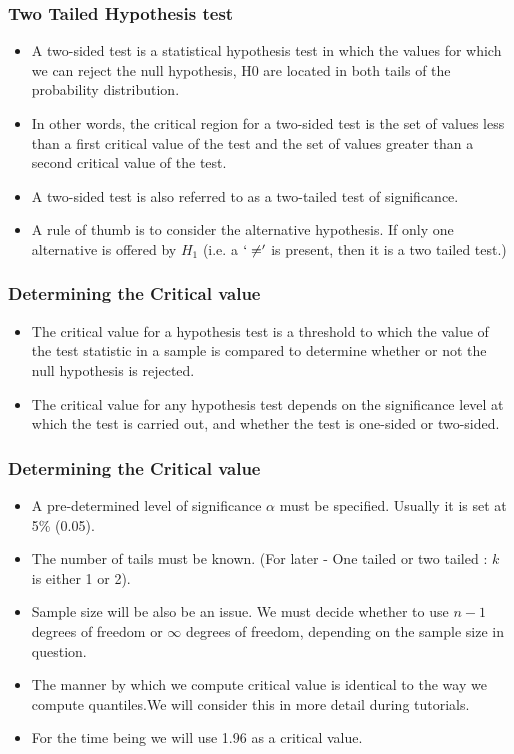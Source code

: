 \begin{frame}
\frametitle{Two Tailed Hypothesis test}
\begin{itemize}
\item
A two-sided test is a statistical hypothesis test in which the values for which we can reject the null hypothesis, H0 are located in both tails of the probability distribution.

\item In other words, the critical region for a two-sided test is the set of values less than a first critical value of the test and the set of values greater than a second critical value of the test.

\item A two-sided test is also referred to as a two-tailed test of significance.
\item A rule of thumb is to consider the alternative hypothesis.  If only one alternative is offered by $H_1$ (i.e. a $`\neq'$ is present, then it is a two tailed test.)
\end{itemize}
\end{frame}




\begin{frame}
\frametitle{Determining the Critical value}
\begin{itemize} \item The critical value for a hypothesis test is a threshold to which the value of the test statistic in a sample is compared to determine whether or not the null hypothesis is rejected.

\item The critical value for any hypothesis test depends on the significance level at which the test is carried out, and whether the test is one-sided or two-sided.
\end{itemize}
\end{frame}




\begin{frame}
\frametitle{Determining the Critical value}
\begin{itemize}
\item A pre-determined level of significance $\alpha$ must be specified. Usually it is set at 5\% (0.05).
\item The number of tails must be known. (For later - One tailed or two tailed : $k$ is either 1 or 2).
\item Sample size will be also be an issue. We must decide whether to use $n-1$ degrees of freedom or $\infty$ degrees of freedom, depending on the sample size in question.
\item The manner by which we compute critical value is identical to the way we compute quantiles.We will consider this in more detail during tutorials.
\item For the time being we will use 1.96 as a critical value.
\end{itemize}
\end{frame}

